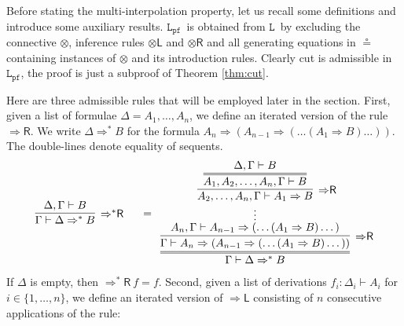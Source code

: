 \documentclass[a4paper,UKenglish,cleveref,autoref,thm-restate, anonymous]{lipics-v2021}
\newcommand{\proofbox}[1]{\begin{array}{c} #1 \end{array}}
\newcommand{\ot}{\otimes}
\newcommand{\Rarr}{\Rightarrow}
\newcommand{\Rs}{\Rightarrow^*}
\newcommand{\mf}[1]{\mathsf{#1}}
\newcommand{\GG}{\Gamma}
\newcommand{\GD}{\Delta}
\newcommand{\GL}{\Lambda}
\renewcommand{\L}{$\mathtt{L}$}
\newcommand{\LPfree}{$\mathtt{L_{pf}}$}
\newcommand{\vd}{\vdash}
\newcommand{\tl}{{\otimes}\mathsf{L}}
\newcommand{\tr}{{\otimes}\mathsf{R}}
\newcommand{\Rl}{{\Rarr}\mathsf{L}}
\newcommand{\Rr}{{\Rarr}\mathsf{R}}
\newcommand{\Rsr}{{\Rs}\mathsf{R}}
\newcommand{\cut}{\mf{cut}}
\begin{document}
Before stating the multi-interpolation property, let us recall some definitions and introduce some auxiliary results.
\LPfree\ is obtained from \L\ by excluding the connective ${\ot}$,  inference rules $\tl$ and $\tr$ and all generating equations in $\circeq$ containing instances of $\ot$ and its introduction rules.
Clearly cut is admissible in \LPfree, the proof is just a subproof of Theorem \ref{thm:cut}.

Here are three admissible rules that will be employed later in the section. 
First, given a list of formulae $\GD = A_1, \dots, A_n$, we define an iterated version of the rule $\Rr$.
We write $\GD \Rarr^* B$ for the formula $A_n \Rarr (A_{n-1} \Rarr (\dots (A_1 \Rarr B)\dots))$.
The double-lines denote equality of sequents.
\begin{equation*}
  \begin{array}{c}
    \proofbox{
      \infer[\Rsr]{\GG \vd \GD \Rs B}{
        \GD , \GG \vd B
      }
    }
    \quad=
    \proofbox{
      \infer={\GG \vd \GD \Rs B}{
        \infer[\Rr]{\GG \vd A_n \Rarr (A_{n-1} \Rarr (\dots (A_1 \Rarr B)\dots))}{
          \deduce[\vdots]{A_n , \GG \vd A_{n-1} \Rarr (\dots (A_1 \Rarr B)\dots)}{
              \infer[\Rr]{A_2 , \dots , A_n , \GG \vd A_1 \Rarr B}{
                \infer={A_1 , A_2 , \dots , A_n , \GG \vd B}{
                  \GD , \GG \vd B
                }
              }
          }
        }
      }
    }
  \end{array}
\end{equation*} 
If $\GD$ is empty, then $\Rsr \ f = f$.
Second, given a list of derivations $f_i : \GD_i \vd A_i$ for $i \in \{1,\dots, n\}$, we define an iterated version of $\Rl$ consisting of $n$ consecutive applications of the rule:
\end{document}
